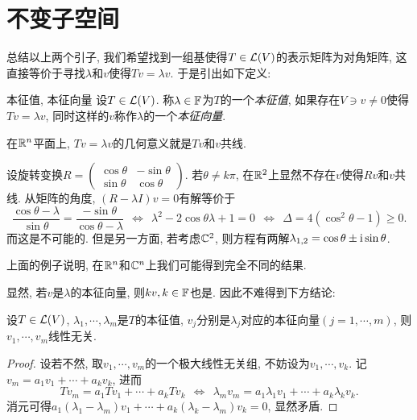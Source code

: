 \section{不变子空间}

总结以上两个引子, 我们希望找到一组基使得$T \in \mathcal{L} (V)$的表示矩阵为对角矩阵, 这直接等价于寻找$\lambda$和$v$使得$Tv=\lambda v$. 于是引出如下定义: 

\begin{definition}{本征值, 本征向量}
	设$T \in \mathcal{L} (V)$. 称$\lambda \in \mathbb{F}$为$T$的一个\textit{本征值}, 如果存在$V \ni v \neq 0$使得$Tv = \lambda v$, 同时这样的$v$称作$\lambda $的一个\textit{本征向量}. 
\end{definition}

在$\mathbb{R} ^n$平面上, $Tv=\lambda v$的几何意义就是$Tv$和$v$共线. 

\begin{example}
	设旋转变换$R = \begin{pmatrix}
 \cos \theta & -\sin \theta \\
 \sin \theta & \cos \theta
\end{pmatrix}$. 若$\theta \neq k\pi$, 在$\mathbb{R} ^2$上显然不存在$v$使得$Rv$和$v$共线. 从矩阵的角度, $(R-\lambda I)v=0$有解等价于$$\frac{\cos \theta - \lambda}{\sin \theta} = \frac{-\sin \theta}{\cos \theta - \lambda} ~~\Leftrightarrow ~~\lambda ^2 - 2\cos \theta \lambda + 1 = 0~~\Leftrightarrow ~~\Delta = 4(\cos ^2 \theta - 1) \geq 0. $$
而这是不可能的. 但是另一方面, 若考虑$\mathbb{C} ^2$, 则方程有两解$\lambda _{1,2} = \cos \theta \pm \operatorname{i} \sin \theta$. 
\end{example}

上面的例子说明, 在$\mathbb{R} ^n$和$\mathbb{C} ^n$上我们可能得到完全不同的结果. 

显然, 若$v$是$\lambda$的本征向量, 则$kv,k \in \mathbb{F}$也是. 因此不难得到下方结论: 

\begin{proposition}{}
	设$T \in \mathcal{L} (V)$, $\lambda _1, \cdots ,\lambda _m$是$T$的本征值, $v_j$分别是$\lambda _j$对应的本征向量$(j=1,\cdots ,m)$, 则$v_1, \cdots ,v_m$线性无关. 
\end{proposition}
\begin{proof}
	设若不然, 取$v_1,\cdots ,v_m$的一个极大线性无关组, 不妨设为$v_1,\cdots ,v_k$. 记$v_m = a_1v_1 + \cdots + a_kv_k$, 进而$$Tv_m = a_1Tv_1 + \cdots + a_kTv_k ~~\Leftrightarrow ~~\lambda _mv_m = a_1\lambda _1v_1 + \cdots + a_k\lambda _kv_k.$$
	消元可得$a_1(\lambda _1-\lambda _m)v_1 + \cdots + a_k(\lambda _k-\lambda _m)v_k = 0$, 显然矛盾. 
\end{proof}

